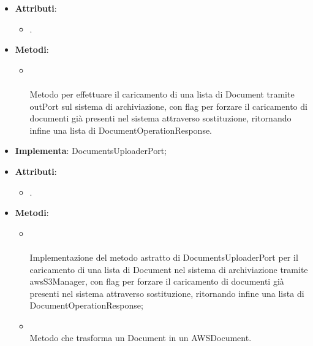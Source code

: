 \documentclass[10pt, a4paper]{article}
\begin{document}
\label{DocumentsUploaderDettaglio}
\begin{itemize}
    \item \textbf{Attributi}:
    \begin{itemize}
        \item {}.
    \end{itemize}
    \item \textbf{Metodi}:
    \begin{itemize}
        \item {}\\ \\ 
        Metodo per effettuare il caricamento di una lista di Document tramite outPort sul sistema di archiviazione, con flag per forzare il caricamento di documenti già presenti nel sistema attraverso sostituzione, ritornando infine una lista di DocumentOperationResponse.
    \end{itemize}
\end{itemize}

\label{DocumentUploaderAWSS3Dettaglio}
\begin{itemize}
    \item \textbf{Implementa}: DocumentsUploaderPort;
    \item \textbf{Attributi}:
    \begin{itemize}
        \item {}.
    \end{itemize}
    \item \textbf{Metodi}:
    \begin{itemize}
        \item {}\\ \\
        Implementazione del metodo astratto di DocumentsUploaderPort per il caricamento di una lista di Document nel sistema di archiviazione tramite awsS3Manager, con flag per  forzare il caricamento di documenti già presenti nel sistema attraverso sostituzione, ritornando infine una lista di DocumentOperationResponse;
        \item {}\\
        Metodo che trasforma un Document in un AWSDocument.
    \end{itemize}
\end{itemize}
\end{document}
